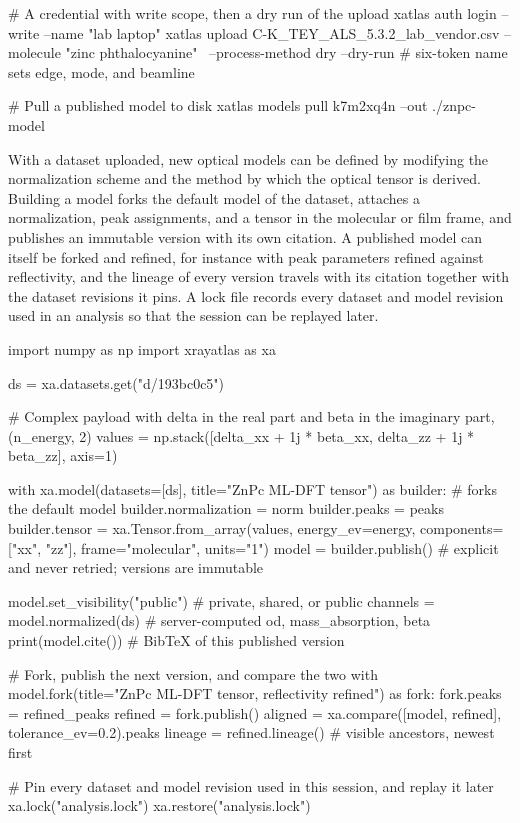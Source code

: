 \begin{codeblock}
# A credential with write scope, then a dry run of the upload
xatlas auth login --write --name "lab laptop"
xatlas upload C-K_TEY_ALS_5.3.2_lab_vendor.csv --molecule "zinc phthalocyanine" \
    --process-method dry --dry-run       # six-token name sets edge, mode, and beamline

# Pull a published model to disk
xatlas models pull k7m2xq4n --out ./znpc-model
\end{codeblock}

With a dataset uploaded, new optical models can be defined by modifying the normalization scheme and the method by which the optical tensor is derived. Building a model forks the default model of the dataset, attaches a normalization, peak assignments, and a tensor in the molecular or film frame, and publishes an immutable version with its own citation. A published model can itself be forked and refined, for instance with peak parameters refined against reflectivity, and the lineage of every version travels with its citation together with the dataset revisions it pins. A lock file records every dataset and model revision used in an analysis so that the session can be replayed later.

\begin{codeblock}
import numpy as np
import xrayatlas as xa

ds = xa.datasets.get("d/193bc0c5")

# Complex payload with delta in the real part and beta in the imaginary part, (n_energy, 2)
values = np.stack([delta_xx + 1j * beta_xx, delta_zz + 1j * beta_zz], axis=1)

with xa.model(datasets=[ds], title="ZnPc ML-DFT tensor") as builder:  # forks the default model
    builder.normalization = norm
    builder.peaks = peaks
    builder.tensor = xa.Tensor.from_array(values, energy_ev=energy, components=["xx", "zz"],
                                          frame="molecular", units="1")
model = builder.publish()             # explicit and never retried; versions are immutable

model.set_visibility("public")        # private, shared, or public
channels = model.normalized(ds)       # server-computed od, mass_absorption, beta
print(model.cite())                   # BibTeX of this published version

# Fork, publish the next version, and compare the two
with model.fork(title="ZnPc ML-DFT tensor, reflectivity refined") as fork:
    fork.peaks = refined_peaks
refined = fork.publish()
aligned = xa.compare([model, refined], tolerance_ev=0.2).peaks
lineage = refined.lineage()           # visible ancestors, newest first

# Pin every dataset and model revision used in this session, and replay it later
xa.lock("analysis.lock")
xa.restore("analysis.lock")
\end{codeblock}

